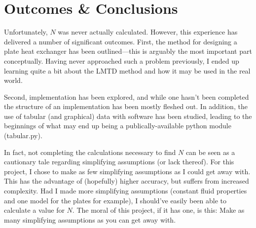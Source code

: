 \documentclass[12pt,letterpaper]{article}
\begin{document}
\section{Outcomes \& Conclusions}

Unfortunately, \(N\) was never actually calculated. However, this experience has delivered a number of significant outcomes. First, the method for designing a plate heat exchanger has been outlined---this is arguably the most important part conceptually. Having never approached such a problem previously, I ended up learning quite a bit about the LMTD method and how it may be used in the real world.

Second, implementation has been explored, and while one hasn't been completed the structure of an implementation has been mostly fleshed out. In addition, the use of tabular (and graphical) data with software has been studied, leading to the beginnings of what may end up being a publically-available python module (tabular.py).

In fact, not completing the calculations necessary to find \(N\) can be seen as a cautionary tale regarding simplifying assumptions (or lack thereof). For this project, I chose to make as few simplifying assumptions as I could get away with. This has the advantage of (hopefully) higher accuracy, but suffers from increased complexity. Had I made more simplifying assumptions (constant fluid properties and one model for the plates for example), I should've easily been able to calculate a value for \(N\). The moral of this project, if it has one, is this:  Make as many simplifying assumptions as you can get away with.
\end{document}
